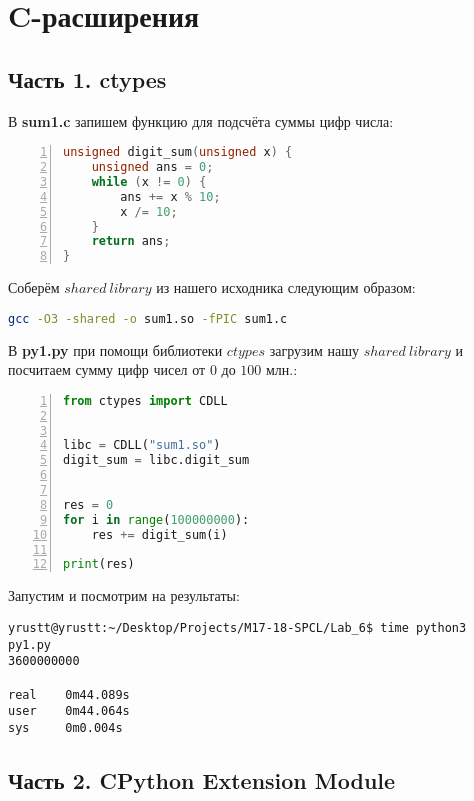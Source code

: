 \documentclass[12pt]{article}
\begin{document}
\section{C-расширения}

\subsection{Часть 1. ctypes}

В \textbf{sum1.c} запишем функцию для подсчёта суммы цифр числа:
\begin{lstlisting}[language=C, xleftmargin=\parindent, frame=L, numbers=left]
unsigned digit_sum(unsigned x) {
    unsigned ans = 0;
    while (x != 0) {
        ans += x % 10;
        x /= 10;
    }
    return ans;
}
\end{lstlisting}
Соберём $shared\ library$ из нашего исходника следующим образом:
\begin{lstlisting}[language=bash, xleftmargin=\parindent]
gcc -O3 -shared -o sum1.so -fPIC sum1.c
\end{lstlisting}
В \textbf{py1.py} при помощи библиотеки $ctypes$ загрузим нашу $shared\ library$ и посчитаем сумму цифр чисел от $0$ до $100$ млн.:
\begin{lstlisting}[language=Python, xleftmargin=\parindent, frame=L, numbers=left]
from ctypes import CDLL


libc = CDLL("sum1.so")
digit_sum = libc.digit_sum


res = 0
for i in range(100000000):
    res += digit_sum(i)

print(res)
\end{lstlisting}
Запустим и посмотрим на результаты:
\begin{lstlisting}
yrustt@yrustt:~/Desktop/Projects/M17-18-SPCL/Lab_6$ time python3 py1.py 
3600000000

real    0m44.089s
user    0m44.064s
sys     0m0.004s
\end{lstlisting}
\newpage
\subsection{Часть 2. CPython Extension Module}
\end{document}
